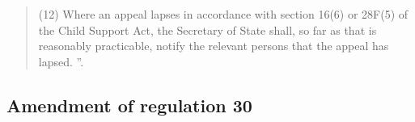 \documentclass[12pt,a4paper]{article}
\begin{document}
\begin{quotation}
(12) Where an appeal lapses in accordance with section 16(6) or 28F(5) of the Child Support Act, the Secretary of State shall, so far as that is reasonably practicable, notify the relevant persons that the appeal has lapsed.%
%
%
%
%
”.
\end{quotation}


\subsection[11. Amendment of regulation 30]{Amendment of regulation 30}
\end{document}
